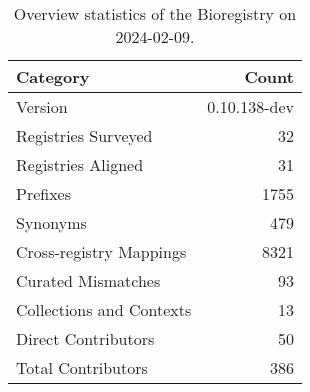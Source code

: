 \begin{table}
\caption{Overview statistics of the Bioregistry on 2024-02-09.}
\label{tab:bioregistry-summary}
\begin{tabular}{lr}
\toprule
Category & Count \\
\midrule
Version & 0.10.138-dev \\
Registries Surveyed & 32 \\
Registries Aligned & 31 \\
Prefixes & 1755 \\
Synonyms & 479 \\
Cross-registry Mappings & 8321 \\
Curated Mismatches & 93 \\
Collections and Contexts & 13 \\
Direct Contributors & 50 \\
Total Contributors & 386 \\
\bottomrule
\end{tabular}
\end{table}
